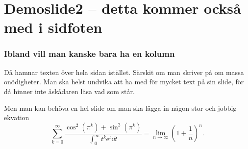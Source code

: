 \documentclass{beamer}
\begin{document}
\section{Demoslide2 -- detta kommer också med i sidfoten}
\begin{frame}
\frametitle{Ibland vill man kanske bara ha en kolumn}
Då hamnar texten över hela sidan istället. Särskit om man skriver på om massa onödigheter. Man ska helst undvika att ha med för mycket text på sin slide, för då hinner inte åskådaren läsa vad som står.

Men man kan behöva en hel slide om man ska lägga in någon stor och jobbig ekvation
\[
\sum_{k=0}^\infty \frac{\cos^2(\pi^k)+\sin^2(\pi^k)}{\int_0^\infty t^k\mathrm{e}^t \dd{t} } 
= \lim_{n\to\infty}\left(1+\frac{1}{n}\right)^n. 
\]

\end{frame}

\begin{frame}

\begin{figure}
\resizebox{.8\textwidth}{!}{}
\end{figure}

\end{frame}
\end{document}
